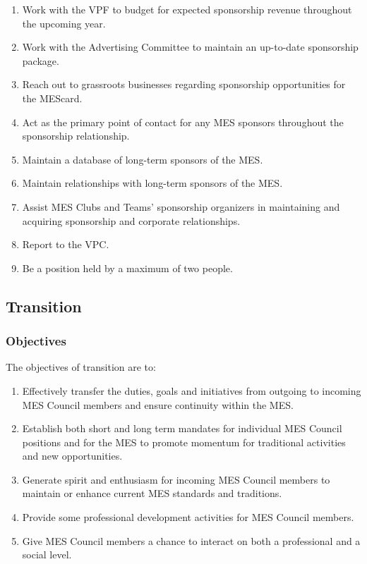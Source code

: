 \begin{enumerate}
 \item
  Work with the VPF to budget for expected sponsorship revenue throughout the upcoming year.
 \item
  Work with the Advertising Committee to maintain an up-to-date sponsorship package.
 \item
  Reach out to grassroots businesses regarding sponsorship opportunities for the MEScard.
 \item
  Act as the primary point of contact for any MES sponsors throughout the sponsorship relationship.
 \item
  Maintain a database of long-term sponsors of the MES.
 \item
  Maintain relationships with long-term sponsors of the MES.
 \item
  Assist MES Clubs and Teams' sponsorship organizers in maintaining and acquiring sponsorship and corporate relationships.
 \item
  Report to the VPC.
 \item
  Be a position held by a maximum of two people.
\end{enumerate}

\subsection{Transition}
\label{transition}
\subsubsection{Objectives}
\label{objectives}
The objectives of transition are to:

\begin{enumerate}
 \item
  Effectively transfer the duties, goals and initiatives from outgoing to incoming MES Council members and ensure continuity within the MES.
 \item
  Establish both short and long term mandates for individual MES Council positions and for the MES to promote momentum for traditional activities and new opportunities.
 \item
  Generate spirit and enthusiasm for incoming MES Council members to maintain or enhance current MES standards and traditions.
 \item
  Provide some professional development activities for MES Council members.
 \item
  Give MES Council members a chance to interact on both a professional and a social level.

\end{enumerate}

